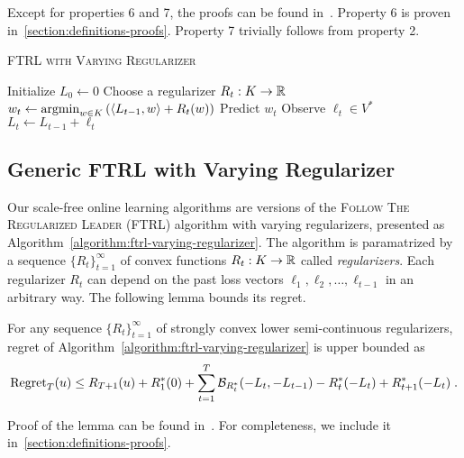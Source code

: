 Except for properties 6 and 7, the proofs can be found
in~\cite{Shalev-Shwartz-2007}.  Property 6 is proven
in~\ref{section:definitions-proofs}. Property 7 trivially follows from property
2.

\begin{algorithm}[t]
\caption{\textsc{FTRL with Varying Regularizer}}
\label{algorithm:ftrl-varying-regularizer}
\begin{algorithmic}[1]
\STATE Initialize $L_0 \leftarrow 0$
\STATE Choose a regularizer $R_t:K \to \mathbb{R}$
\STATE $w_t \leftarrow \operatorname*{argmin}_{w \in K} \left( \langle L_{t-1}, w \rangle + R_t(w) \right)$
\STATE Predict $w_t$
\STATE Observe $\ell_t \in V^*$
\STATE $L_t \leftarrow L_{t-1} + \ell_t$
\ENDFOR
\end{algorithmic}
\end{algorithm}

\subsection{Generic FTRL with Varying Regularizer}
\label{section:generic-ftrl}

Our scale-free online learning algorithms are versions of the \textsc{Follow
The Regularized Leader} (\textsc{FTRL}) algorithm with varying regularizers,
presented as Algorithm~\ref{algorithm:ftrl-varying-regularizer}. The algorithm is
paramatrized by a sequence $\{R_t\}_{t=1}^\infty$ of convex functions $R_t:K
\to \mathbb{R}$ called \emph{regularizers}.  Each regularizer $R_t$ can depend on
the past loss vectors $\ell_1, \ell_2, \dots, \ell_{t-1}$ in an arbitrary way.
The following lemma bounds its regret.

\begin{lemma}
\label{lemma:generic-regret-bound}
For any sequence $\{R_t\}_{t=1}^\infty$ of strongly convex lower
semi-continuous regularizers, regret of
Algorithm~\ref{algorithm:ftrl-varying-regularizer} is upper
bounded as
$$
\operatorname{Regret}_T(u) \le R_{T+1}(u) + R_1^*(0) + \sum_{t=1}^{T} \mathcal{B}_{R_t^*}(-L_t, -L_{t-1}) - R_t^*(-L_t) + R_{t+1}^*(-L_t) \; .
$$
\end{lemma}

Proof of the lemma can be found in~\cite{Orabona-Crammer-Cesa-Bianchi-2014}. For completeness,
we include it in~\ref{section:definitions-proofs}.
